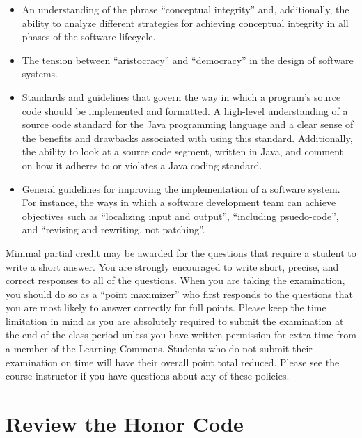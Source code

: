 \begin{itemize}
  \item An understanding of the phrase ``conceptual integrity'' and, additionally, the ability to analyze different
    strategies for achieving conceptual integrity in all phases of the software lifecycle.

  \item The tension between ``aristocracy'' and ``democracy'' in the design of software systems.

  \item Standards and guidelines that govern the way in which a program's source code should be implemented and
    formatted. A high-level understanding of a source code standard for the Java programming language and a clear sense
    of the benefits and drawbacks associated with using this standard. Additionally, the ability to look at a source
    code segment, written in Java, and comment on how it adheres to or violates a Java coding standard.

  \item General guidelines for improving the implementation of a software system. For instance, the ways in which a
    software development team can achieve objectives such as ``localizing input and output'', ``including psuedo-code'',
    and ``revising and rewriting, not patching''.

\end{itemize}

\vspace*{-.05in}
\noindent Minimal partial credit may be awarded for the questions that require a student to write a short answer. You
are strongly encouraged to write short, precise, and correct responses to all of the questions. When you are taking the
examination, you should do so as a ``point maximizer'' who first responds to the questions that you are most likely to
answer correctly for full points. Please keep the time limitation in mind as you are absolutely required to submit the
examination at the end of the class period unless you have written permission for extra time from a member of the
Learning Commons. Students who do not submit their examination on time will have their overall point total reduced.
Please see the course instructor if you have questions about any of these policies.

\vspace*{-.1in}
\section*{Review the Honor Code}
\vspace*{-.06in}

